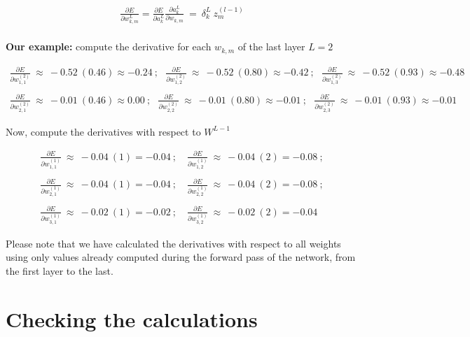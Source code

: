 \documentclass{article}
\begin{document}
\begin{gather*}
\frac{\partial E}{\partial w_{k,m}^{L}}
= \frac{\partial E}{\partial a_{k}^{L}} \frac{\partial a_{k}^{L}}{\partial w_{k,m}} \ =\ \delta_k^{L} \ z_{m}^{( l-1)} \label{eq:delta-from-w}
\end{gather*}\\

\textbf{Our example:}  compute the derivative for each  $w_{k,m}$ of the last layer $L=2$


{\small
\begin{gather*}
\frac{\partial E}{\partial w_{1,1}^{( 2)}} \ \approx\ -0.52\ ( 0.46 ) \approx -0.24 \ ;\ \ \
\frac{\partial E}{\partial w_{1,2}^{( 2)}} \ \approx\ -0.52\ ( 0.80 ) \approx -0.42 \ ;\ \ \
\frac{\partial E}{\partial w_{1,3}^{( 2)}} \ \approx\ -0.52\ ( 0.93 ) \approx -0.48 \\
\\
\frac{\partial E}{\partial w_{2,1}^{( 2)}} \ \approx\ -0.01\ ( 0.46 ) \approx 0.00 \ ;\ \ \
\frac{\partial E}{\partial w_{2,2}^{( 2)}} \ \approx\ -0.01\ ( 0.80 ) \approx -0.01 \ ;\ \ \
\frac{\partial E}{\partial w_{2,3}^{( 2)}} \ \approx\ -0.01\ ( 0.93 ) \approx -0.01
\end{gather*}
}


Now, compute the derivatives with respect to $W^{L-1}$


{\small
\begin{gather*}
\frac{\partial E}{\partial w_{1,1}^{( 1)}} \ \approx\ -0.04\ ( 1 ) = -0.04 \ ;\quad
\frac{\partial E}{\partial w_{1,2}^{( 1)}} \ \approx\ -0.04\ ( 2 ) = -0.08 \ ;\\
\\
\frac{\partial E}{\partial w_{2,1}^{( 1)}} \ \approx\ -0.04\ ( 1 ) = -0.04 \ ;\quad
\frac{\partial E}{\partial w_{2,2}^{( 1)}} \ \approx\ -0.04\ ( 2 ) = -0.08 \ ;\\
\\
\frac{\partial E}{\partial w_{3,1}^{( 1)}} \ \approx\ -0.02\ ( 1 ) = -0.02 \ ;\quad
\frac{\partial E}{\partial w_{3,2}^{( 1)}} \ \approx\ -0.02\ ( 2 ) = -0.04
\end{gather*}
}

 Please note that we have calculated the derivatives with respect to all weights using only values already computed during the forward pass of the network, from the first layer to the last.

\section{Checking the calculations}
\end{document}

